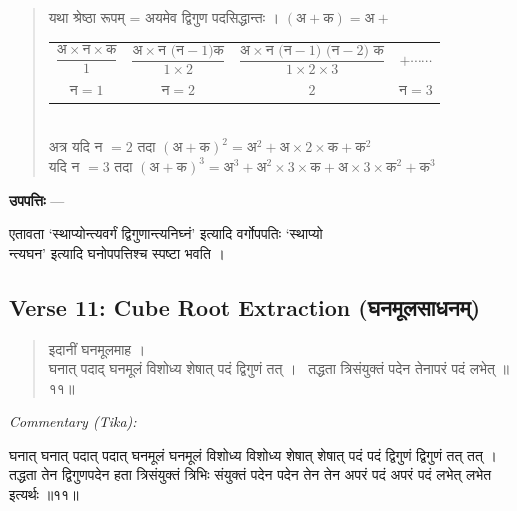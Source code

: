 \documentclass[11pt,a4paper]{article}
\newcommand{\dev}[1]{{\devanagarifont #1}}
\newcommand{\skt}[1]{{\devanagarifont\color{sktcolor} #1}}
\newenvironment{shloka}{%
  \begin{quote}%
  \smallskip%
  \devanagarifont\color{sktcolor}%
}{%
  \smallskip%
  \end{quote}%
}
\newenvironment{tika}{%
  \smallskip%
  \noindent\textit{Commentary (Tika):}\par%
  \smallskip%
  \hindifont\small%
}{%
  \par\smallskip%
}
\newenvironment{upapatti}{%
  \smallskip%
  \noindent\textbf{\devanagarifont उपपत्तिः} — \devanagarifont\small%
}{%
  \par\smallskip%
}
\begin{document}
\begin{shloka}
\skt{यथा श्रेष्ठा रूपम् = अयमेव द्विगुण पदसिद्धान्तः ।} $(\text{अ} + \text{क}) = \text{अ} +$\\[0.5em]
\begin{tabular}{c|c|c|c}
$\dfrac{\text{अ} \times \text{न} \times \text{क}}{1}$ & $\dfrac{\text{अ} \times \text{न (न}-1)\text{क}}{1 \times 2}$ & $\dfrac{\text{अ} \times \text{न (न}-1)\text{ (न}-2)\text{ क}}{1 \times 2 \times 3}$ & $+ \cdots\cdots$ \\
$\text{न} = 1$ & $\text{न} = 2$ & $2$ & $\text{न} = 3$ \\  
\end{tabular}
\\[1em]
\skt{अत्र यदि न} $= 2$ \skt{तदा} $(\text{अ} + \text{क})^2 = \text{अ}^2 + \text{अ} \times 2 \times \text{क} + \text{क}^2$\\[0.5em]
\skt{यदि न} $= 3$ \skt{तदा} $(\text{अ} + \text{क})^3 = \text{अ}^3 + \text{अ}^2 \times 3 \times \text{क} + \text{अ} \times 3 \times \text{क}^2 + \text{क}^3$
\end{shloka}

\vspace{0.5cm}

\begin{upapatti}
\skt{एतावता `स्थाप्योन्त्यवर्गं द्विगुणान्त्यनिघ्नं' इत्यादि वर्गोपपतिः `स्थाप्यो}\\
\skt{न्त्यघन' इत्यादि घनोपपत्तिश्च स्पष्टा भवति ।}
\end{upapatti}

\subsection*{Verse 11: Cube Root Extraction (\dev{घनमूलसाधनम्})}

\begin{shloka}
\skt{इदानीं घनमूलमाह ।}\\[0.5em]
\skt{घनात् पदाद् घनमूलं विशोध्य शेषात् पदं द्विगुणं तत् ।}\
\skt{तद्धता त्रिसंयुक्तं पदेन तेनापरं पदं लभेत्} ॥११॥
\end{shloka}

\vspace{0.3cm}
\begin{tika}
\skt{घनात्} घनात् \skt{पदात्} पदात् \skt{घनमूलं} घनमूलं \skt{विशोध्य} विशोध्य \skt{शेषात्} शेषात् \skt{पदं} पदं \skt{द्विगुणं} द्विगुणं \skt{तत्} तत् । \skt{तद्धता} तेन द्विगुणपदेन हता \skt{त्रिसंयुक्तं} त्रिभिः संयुक्तं \skt{पदेन} पदेन \skt{तेन} तेन \skt{अपरं पदं} अपरं पदं \skt{लभेत्} लभेत इत्यर्थः ॥११॥
\end{tika}
\end{document}
